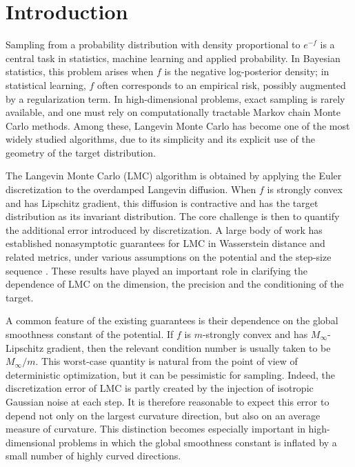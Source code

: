 \documentclass[aos,reqno]{imsart}
\def\Mmax{M_{\infty}}
\theoremstyle{definition}
\begin{document}
\section{Introduction}

Sampling from a probability distribution with density
proportional to $e^{-f}$ is a central task in statistics,
machine learning and applied probability. In Bayesian
statistics, this problem arises when $f$ is the negative
log-posterior density; in statistical learning, $f$ often
corresponds to an empirical risk, possibly augmented by a
regularization term. In high-dimensional problems, exact
sampling is rarely available, and one must rely on
computationally tractable Markov chain Monte Carlo methods.
Among these, Langevin Monte Carlo has become one of the
most widely studied algorithms, due to its simplicity and
its explicit use of the geometry of the target distribution.

The Langevin Monte Carlo (LMC) algorithm is obtained by applying
the Euler discretization to the overdamped Langevin
diffusion. When $f$ is strongly convex and has Lipschitz
gradient, this diffusion is contractive and has the target
distribution as its invariant distribution. The core 
challenge is then to quantify the additional error introduced
by discretization. A large body of work has established
nonasymptotic guarantees for LMC in Wasserstein distance and
related metrics, under various assumptions on the potential
and the step-size sequence
\citep{DalalyanColt,dalalyan2019user,durmus2019,
durmus2019analysis}. These results have played an important
role in clarifying the dependence of LMC on the dimension,
the precision and the conditioning of the target.

A common feature of the existing guarantees is their
dependence on the global smoothness constant of the
potential. If $f$ is $m$-strongly convex and has
$\Mmax$-Lipschitz gradient, then the relevant condition
number is usually taken to be $\Mmax/m$. This worst-case
quantity is natural from the point of view of deterministic
optimization, but it can be pessimistic for sampling. Indeed,
the discretization error of LMC is partly created 
by the injection
of isotropic Gaussian noise at each step. It is therefore
reasonable to expect this error to depend not only on the
largest curvature direction, but also on an average measure
of curvature. This distinction becomes especially important
in high-dimensional problems in which the global smoothness
constant is inflated by a small number of highly curved
directions.
\end{document}
